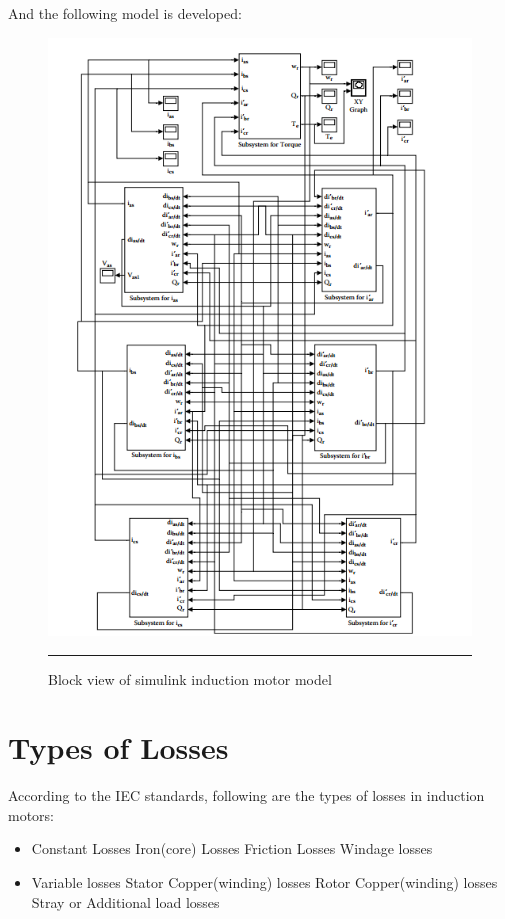 And the following model is developed:
\begin{figure}[htbp]
	\centering
		\includegraphics[width = 4.5in]{./Figures/MS/eq28.png}
		\rule{35em}{0.5pt}
	\caption{Block view of simulink induction motor model}
	\label{fig:Block view of simulink induction motor model}
\end{figure}

\section{Types of Losses}
According to the IEC standards\cite{iec6003421}, following are the types of losses in induction motors:
\begin{itemize}
\item Constant Losses
\subitem Iron(core) Losses
\subitem Friction Losses
\subitem Windage losses
\item Variable losses
\subitem Stator Copper(winding) losses
\subitem Rotor Copper(winding) losses
\subitem Stray or Additional load losses 
\end{itemize}

